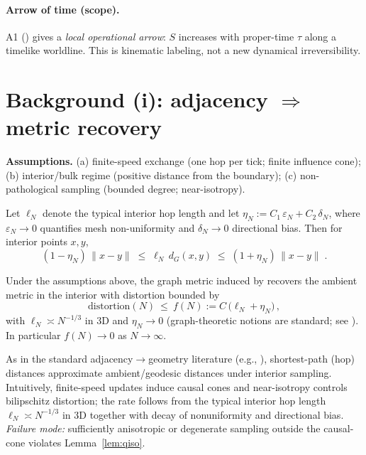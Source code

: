 \documentclass[11pt,a4paper]{article}
\begin{document}
\paragraph{Arrow of time (scope).}
A1 (\EtLaw) gives a \emph{local operational arrow}: $S$ increases with \gls{proper-time} $\tau$ along a timelike worldline. This is kinematic labeling, not a new dynamical irreversibility.

\section{\texorpdfstring{Background (i): adjacency \(\Rightarrow\) metric recovery}{Background (i): adjacency → metric recovery}}

\textbf{Assumptions.} (a) finite-speed exchange (one hop per \gls{tick}; finite influence cone); (b) interior/bulk regime (positive distance from the boundary); (c) non-pathological sampling (bounded degree; near-isotropy).

\begin{lemma}\label{lem:qiso}
Let $\ell_N$ denote the typical interior hop length and let $\eta_N:=C_1\,\varepsilon_N + C_2\,\delta_N$, where $\varepsilon_N\!\to\!0$ quantifies mesh non-uniformity and $\delta_N\!\to\!0$ directional bias. Then for interior points $x,y$,
\smallskip
\begin{equation}\label{eq:qiso-bilip}
(1-\eta_N)\,\|x-y\| \;\le\; \ell_N\, d_G(x,y) \;\le\; (1+\eta_N)\,\|x-y\|\;.
\end{equation}
\end{lemma}

\begin{theorem}\label{thm:interior}
Under the assumptions above, the graph metric induced by  recovers the ambient metric in the interior with distortion bounded by
\smallskip
\begin{equation}\label{eq:distortion-bound}
\mathrm{distortion}(N)\ \le\ f(N):=C\,\big(\ell_N + \eta_N\big)\,,
\end{equation}
with $\ell_N\asymp N^{-1/3}$ in 3D and $\eta_N\to0$ (graph-theoretic notions are standard; see \cite{lovasz1993random}). In particular $f(N)\to0$ as $N\to\infty$.
\end{theorem}

\begin{remark}
As in the standard adjacency$\to$geometry literature (e.g., \cite{Tenenbaum2000,lovasz1993random}), shortest-path (hop) distances approximate ambient/geodesic distances under interior sampling. Intuitively, finite-speed updates induce causal cones and near-isotropy controls bilipschitz distortion; the rate follows from the typical interior hop length $\ell_N\!\asymp\! N^{-1/3}$ in 3D together with decay of nonuniformity and directional bias. \emph{Failure mode:} sufficiently anisotropic or degenerate sampling outside the \gls{causal-cone} violates Lemma~\ref{lem:qiso}.
\end{remark}
\end{document}
